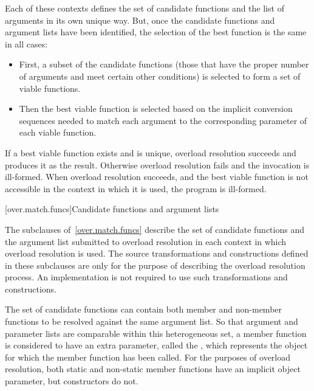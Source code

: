 Each of these contexts defines the set of candidate functions and
the list of arguments in its own unique way.
But, once the
candidate functions and argument lists have been identified, the
selection of the best function is the same in all cases:

\begin{itemize}
\item
First, a subset of the candidate functions (those that have
the proper number of arguments and meet certain other
conditions) is selected to form a set of
%
viable functions.
\item
Then the best viable function is selected based on the
implicit conversion sequences needed to
match each argument to the corresponding parameter of each
viable function.
\end{itemize}

\pnum
If a best viable function exists and is unique, overload
resolution succeeds and produces it as the result.
Otherwise
overload resolution fails and the invocation is ill-formed.
When overload resolution succeeds,
and the best viable function is not accessible in the context
in which it is used,
the program is ill-formed.

[over.match.funcs]{Candidate functions and argument lists}%
%

\pnum
The subclauses of~\ref{over.match.funcs} describe
the set of candidate functions and the argument list submitted to
overload resolution in each context in which
overload resolution is used.
The source transformations and constructions defined
in these subclauses are only for the purpose of describing the
overload resolution process.
An implementation is not required
to use such transformations and constructions.

\pnum
{}%
%
The set of candidate functions can contain both member and non-member
functions to be resolved against the same argument list.
So that argument and parameter lists are comparable within this
heterogeneous set, a member function is considered to have an
extra parameter, called the
,
which represents the object for which the member function has been
called.
For the purposes of overload resolution, both static and
non-static member functions have an implicit object parameter,
but constructors do not.


